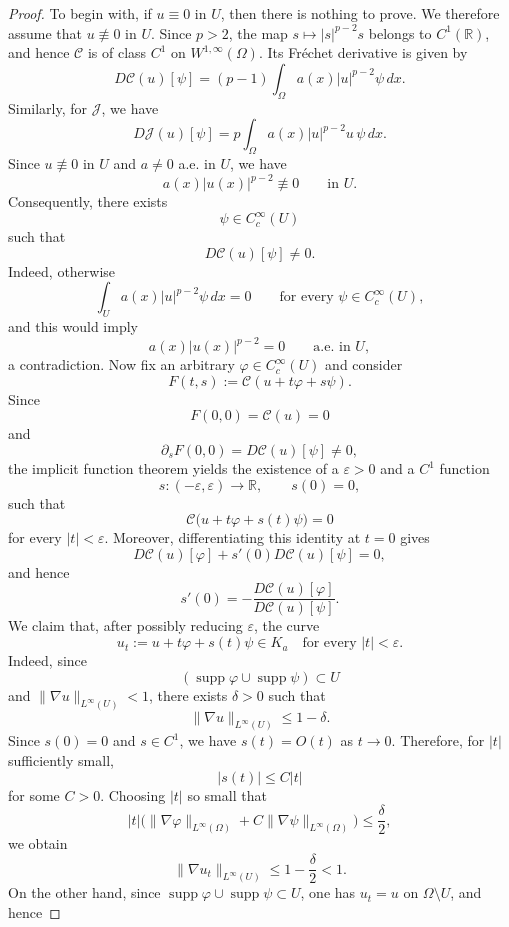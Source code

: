 \documentclass[11pt,reqno]{amsart}
\theoremstyle{plain}
\theoremstyle{definition}
\numberwithin{equation}{section}
\begin{document}
\begin{proof}
To begin with, if $u\equiv0$ in $U$, then there is nothing to prove.
We therefore assume that $u\not\equiv0$ in $U$. Since $p>2$, the map
$s\mapsto |s|^{p-2}s$ belongs to $C^1(\mathbb R)$, and hence
$\mathcal C$ is of class $C^1$ on $W^{1,\infty}(\Omega)$. Its Fr\'echet
derivative is given by
$$
D\mathcal C(u)[\psi]
=
(p-1)\int_\Omega
a(x)|u|^{p-2}\psi\,dx.
$$
Similarly, for $\mathcal{J}$, we have
$$
D\mathcal J(u)[\psi]
=
p\int_\Omega
a(x)|u|^{p-2}u\,\psi\,dx.
$$
Since $u\not\equiv0$ in $U$ and $a\neq0$ a.e. in $U$, we have
$$
a(x)|u(x)|^{p-2}\not\equiv0
\qquad\text{in }U.
$$
Consequently, there exists
$$
\psi\in C_c^\infty(U)
$$
such that
\begin{equation}\label{eq:Cnotnull}
D\mathcal C(u)[\psi]\neq0.
\end{equation}
Indeed, otherwise
$$
\int_U a(x)|u|^{p-2}\psi\,dx=0
\qquad
\text{for every }\psi\in C_c^\infty(U),
$$
and this would imply
$$
a(x)|u(x)|^{p-2}=0
\qquad\text{a.e. in }U,
$$
a contradiction. Now fix an arbitrary $\varphi\in C_c^\infty(U)$ and consider
$$
F(t,s)
:=
\mathcal C(u+t\varphi+s\psi).
$$
Since
$$
F(0,0)=\mathcal C(u)=0
$$
and
$$
\partial_sF(0,0)
=
D\mathcal C(u)[\psi]\neq0,
$$
the implicit function theorem yields the existence of a $\varepsilon>0$ and a
$C^1$ function
$$
s:(-\varepsilon,\varepsilon)\to\mathbb R,
\qquad
s(0)=0,
$$
such that
$$
\mathcal C
\bigl(
u+t\varphi+s(t)\psi
\bigr)=0
$$
for every $|t|<\varepsilon$. Moreover, differentiating this identity at $t=0$ gives
$$
D\mathcal C(u)[\varphi]
+
s'(0)D\mathcal C(u)[\psi]
=0,
$$
and hence
\begin{equation} \label{eq:sprime}
s'(0)
=
-
\frac{
D\mathcal C(u)[\varphi]
}{
D\mathcal C(u)[\psi]
}.
\end{equation}
We claim that, after possibly reducing $\varepsilon$, the curve
$$
u_t:=u+t\varphi+s(t)\psi \in K_a \quad \text{for every } |t| < \varepsilon. 
$$
Indeed, since
$$
\left(\operatorname{supp}\varphi\cup\operatorname{supp}\psi \right)
\subset U
$$
and $\|\nabla u\|_{L^\infty(U)}<1$, there exists $\delta>0$ such that
$$
\|\nabla u\|_{L^\infty(U)}
\le 1-\delta.
$$
Since $s(0)=0$ and $s\in C^1$, we have $s(t)=O(t)$ as $t\to0$. Therefore, for $|t|$ sufficiently small,
$$
|s(t)|\leq C|t|
$$
for some $C>0$. Choosing $|t|$ so small that
$$
|t|\bigl(\|\nabla\varphi\|_{L^\infty(\Omega)}+C\|\nabla\psi\|_{L^\infty(\Omega)}\bigr)
\leq \frac{\delta}{2},
$$
we obtain
$$
\|\nabla u_t\|_{L^\infty(U)}
\leq 1-\frac{\delta}{2}<1.
$$
On the other hand, since $\operatorname{supp}\varphi\cup\operatorname{supp}\psi\subset U$, one has $u_t=u$ on $\Omega\setminus U$, and hence

\end{proof}
\end{document}
